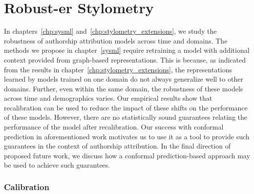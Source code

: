 \section{Robust-er Stylometry}

In chapters~\ref{chp:sysml} and~\ref{chp:stylometry_extensions}, we study the robustness of authorship attribution models across time and domains.
The methods we propose in chapter~\ref*{sysml} require retraining a model with additional context provided from graph-based representations.
This is because, as indicated from the results in chapter~\ref*{chp:stylometry_extensions}, the representations learned by models trained on one domain do not always generalize well to other domains.
Further, even within the same domain, the robustness of these models across time and demographics varies.
Our empirical results show that recalibration can be used to reduce the impact of these shifts on the performance of these models.
However, there are no statistically sound guarantees relating the performance of the model after recalibration.
Our success with conformal prediction in aforementioned work motivates us to use it as a tool to provide such guarantees in the context of authorship attribution.
In the final direction of proposed future work, we discuss how a conformal prediction-based approach may be used to achieve such guarantees.

\subsubsection{Calibration}

